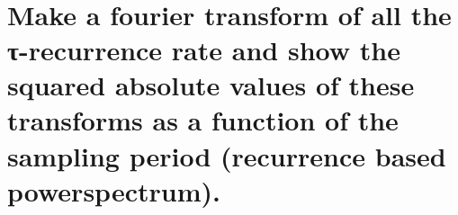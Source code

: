 \documentclass[11pt]{article}
\begin{document}
    \begin{center}
    \end{center}
    { \hspace*{\fill} \\}

    \hypertarget{make-a-fourier-transform-of-all-the-ux3c4-recurrence-rate-and-show-the-squared-absolute-values-of-these-transforms-as-a-function-of-the-sampling-period-recurrence-based-powerspectrum.}{%
\section{Make a fourier transform of all the τ-recurrence rate and show
the squared absolute values of these transforms as a function of the
sampling period (recurrence based
powerspectrum).}\label{make-a-fourier-transform-of-all-the-ux3c4-recurrence-rate-and-show-the-squared-absolute-values-of-these-transforms-as-a-function-of-the-sampling-period-recurrence-based-powerspectrum.}}
\end{document}
